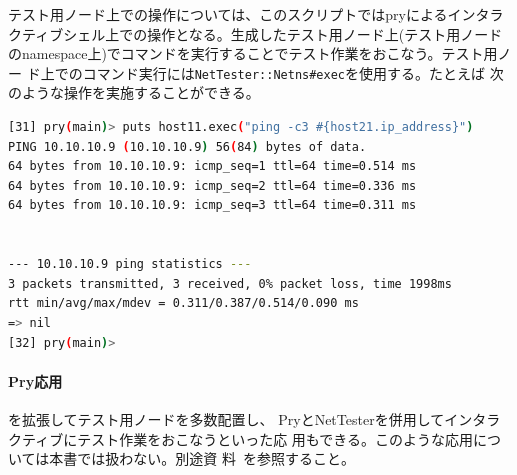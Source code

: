 テスト用ノード上での操作については、このスクリプトではpryによるインタラ
クティブシェル上での操作となる。生成したテスト用ノード上(テスト用ノード
のnamespace上)でコマンドを実行することでテスト作業をおこなう。テスト用ノー
ド上でのコマンド実行には\verb|NetTester::Netns#exec|を使用する。たとえば
次のような操作を実施することができる。
\begin{lstlisting}[language=sh,title=テスト作業例]
[31] pry(main)> puts host11.exec("ping -c3 #{host21.ip_address}")
PING 10.10.10.9 (10.10.10.9) 56(84) bytes of data.
64 bytes from 10.10.10.9: icmp_seq=1 ttl=64 time=0.514 ms
64 bytes from 10.10.10.9: icmp_seq=2 ttl=64 time=0.336 ms
64 bytes from 10.10.10.9: icmp_seq=3 ttl=64 time=0.311 ms


--- 10.10.10.9 ping statistics ---
3 packets transmitted, 3 received, 0% packet loss, time 1998ms
rtt min/avg/max/mdev = 0.311/0.387/0.514/0.090 ms
=> nil
[32] pry(main)>
\end{lstlisting}

    \paragraph{Pry応用}
を拡張してテスト用ノードを多数配置し、
PryとNetTesterを併用してインタラクティブにテスト作業をおこなうといった応
用もできる。このような応用については本書では扱わない。別途資
料~\cite{nettester-pry}を参照すること。


